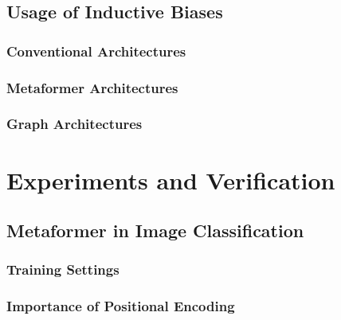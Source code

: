\documentclass[
headings=optiontohead,              %
12pt,                               %
DIV=13,                             %
twoside=false,                      %
open=right,                         %
BCOR=00mm,                          %
toc=bibliographynumbered            %
]{scrreport}
\begin{document}
    \section{Usage of Inductive Biases}
    \label{sec:biases}
    
        \subsection{Conventional Architectures}
        \label{sec:architectures-biasesnormal}
        
        \FloatBarrier
        \subsection{Metaformer Architectures}
        \label{sec:architectures-biasesmetaformer}
        
        \FloatBarrier
        \subsection{Graph Architectures}
        \label{sec:architectures-biasesgraph}
        
        \FloatBarrier

\chapter{Experiments and Verification}
\label{sec:experiments}
    \section{Metaformer in Image Classification}
    \label{sec:experiments-image-classification}
    
        \subsection{Training Settings}
        \label{sec:experiments-trainingsettings}
        
        \FloatBarrier
        \subsection{Importance of Positional Encoding}
        \label{sec:experiments-positionalencoding}
        
        \FloatBarrier
\end{document}
